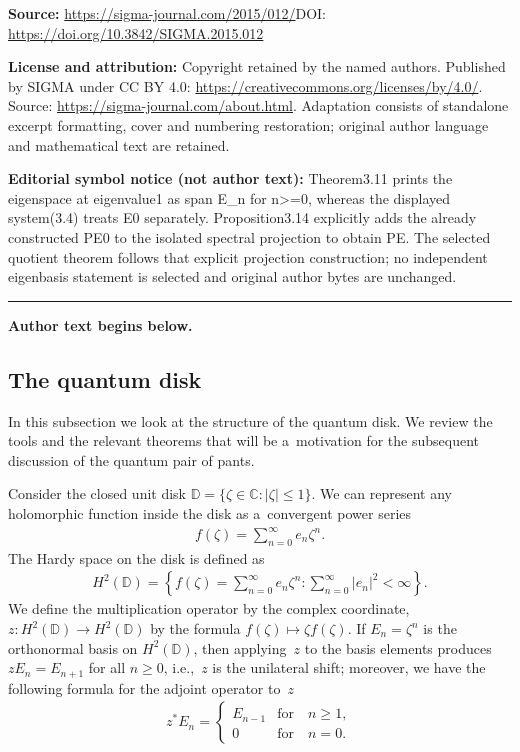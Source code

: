 \documentclass[11pt]{article}
\numberwithin{equation}{section}
\begin{document}
\noindent\textbf{Source:} \url{https://sigma-journal.com/2015/012/}\quad DOI: \url{https://doi.org/10.3842/SIGMA.2015.012}\par
\noindent\textbf{License and attribution:} Copyright retained by the named authors. Published by SIGMA under CC BY 4.0: \url{https://creativecommons.org/licenses/by/4.0/}. Source: \url{https://sigma-journal.com/about.html}. Adaptation consists of standalone excerpt formatting, cover and numbering restoration; original author language and mathematical text are retained.\par
\noindent\textbf{Editorial symbol notice (not author text):} Theorem3.11 prints the eigenspace at eigenvalue1 as span E\_n for n>=\allowbreak{}0, whereas the displayed system(3.4) treats E0 separately. Proposition3.14 explicitly adds the already constructed PE0 to the isolated spectral projection to obtain PE. The selected quotient theorem follows that explicit projection construction; no independent eigenbasis statement is selected and original author bytes are unchanged.\par
\medskip\hrule\medskip\noindent\textbf{Author text begins below.}\par
\setcounter{section}{2}
\setcounter{subsection}{0}
\setcounter{subsubsection}{0}
\setcounter{Theorem}{0}
\setcounter{equation}{0}

\subsection{The quantum disk}

In this subsection we look at the structure of the quantum disk.
We review the tools and the relevant theorems that will be a~motivation for the subsequent discussion of the quantum
pair of pants.

Consider the closed unit disk ${\mathbb D}=\{\zeta\in{\mathbb C}: |\zeta|\leq 1\}$.
We can represent any holomorphic function inside the disk as a~convergent power series
\begin{gather*}
f(\zeta)=\sum\limits_{n=0}^\infty e_n\zeta^n.
\end{gather*}
The Hardy space on the disk is def\/ined as
\begin{gather*}
H^2({\mathbb D})=\left\{f(\zeta)=\sum\limits_{n=0}^\infty e_n\zeta^n: \sum\limits_{n=0}^\infty|e_n|^2
<\infty\right\}.
\end{gather*}
We def\/ine the multiplication operator by the complex coordinate, $z:H^2({\mathbb D}) \to H^2({\mathbb D})$ by the
formula $f(\zeta)\mapsto \zeta f(\zeta)$.
If $E_n=\zeta^n$ is the orthonormal basis on $H^2({\mathbb D})$, then applying~$z$ to the basis elements produces
$zE_n=E_{n+1}$ for all $n \geq 0$, i.e.,~$z$ is the unilateral shift; moreover, we have the following formula for the adjoint operator to~$z$
\begin{gather*}
z^*E_n=
\begin{cases}
E_{n-1} &\text{for} \quad  n\ge 1,
\\
0  &\text{for} \quad n=0.
\end{cases}
\end{gather*}
\end{document}

